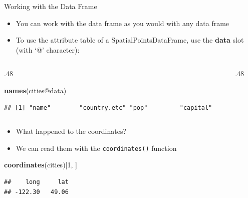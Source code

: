 \documentclass[10pt,ignorenonframetext,]{beamer}
\newenvironment{Shaded}{\begin{snugshade}}{\end{snugshade}}
\newcommand{\KeywordTok}[1]{\textcolor[rgb]{0.13,0.29,0.53}{\textbf{{#1}}}}
\newcommand{\DecValTok}[1]{\textcolor[rgb]{0.00,0.00,0.81}{{#1}}}
\newcommand{\NormalTok}[1]{{#1}}
\providecommand{\tightlist}{%
  \setlength{\itemsep}{0pt}\setlength{\parskip}{0pt}}
\def\begincols{\begin{columns}}
\def\begincol{\begin{column}}
\def\endcol{\end{column}}
\def\endcols{\end{columns}}
\begin{document}
\begin{frame}[fragile]{Working with the Data Frame}

\begin{itemize}
\tightlist
\item
  You can work with the data frame as you would with any data frame
\item
  To use the attribute table of a SpatialPointsDataFrame, use the
  \textbf{data} slot (with `@' character):
\end{itemize}

\begincols
\begincol{.48\textwidth}

\begin{Shaded}
\begin{Highlighting}[]
\KeywordTok{names}\NormalTok{(cities@data)}
\end{Highlighting}
\end{Shaded}

\begin{verbatim}
## [1] "name"        "country.etc" "pop"         "capital"
\end{verbatim}

\endcol
\begincol{.48\textwidth}

\endcol
\endcols

\begin{itemize}
\tightlist
\item
  What happened to the coordinates?
\item
  We can read them with the \texttt{coordinates()} function
\end{itemize}

\begin{Shaded}
\begin{Highlighting}[]
\KeywordTok{coordinates}\NormalTok{(cities)[}\DecValTok{1}\NormalTok{, ]}
\end{Highlighting}
\end{Shaded}

\begin{verbatim}
##    long     lat 
## -122.30   49.06
\end{verbatim}

\end{frame}
\end{document}
